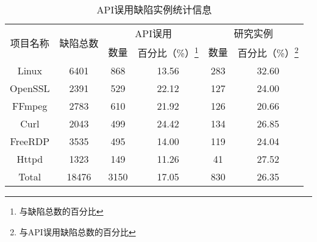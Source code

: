 \begin{table}[b]
	\centering
	\begin{minipage}[t]{0.75\linewidth} %
		\caption{API误用缺陷实例统计信息}
		\label{tab:2-3-studied}
		\begin{tabular}{cccccc}
			\hline
			\multirow{2}{*}{项目名称} & \multirow{2}{*}{缺陷总数} & \multicolumn{2}{c}{API误用}& \multicolumn{2}{c}{研究实例}\\
			\cline{3-4}\cline{5-6}
			&  & 数量 & 百分比（\%）\footnote{与缺陷总数的百分比} & 数量& 百分比（\%）\footnote{与API误用缺陷总数的百分比} \\
			\hline
			Linux & 6401 & 868 & 13.56 & 283 & 32.60 \\
			OpenSSL & 2391 & 529 & 22.12 &127  & 24.00 \\
			FFmpeg & 2783 & 610 & 21.92 & 126 & 20.66 \\
			Curl & 2043 & 499 & 24.42 & 134 & 26.85 \\
			FreeRDP & 3535 & 495 & 14.00 & 119 & 24.04 \\
			Httpd & 1323 & 149 & 11.26 & 41 & 27.52 \\
			\hline
			Total & 18476 & 3150 & 17.05 & 830 & 26.35 \\
			\hline
		\end{tabular}
	\end{minipage}
\end{table}